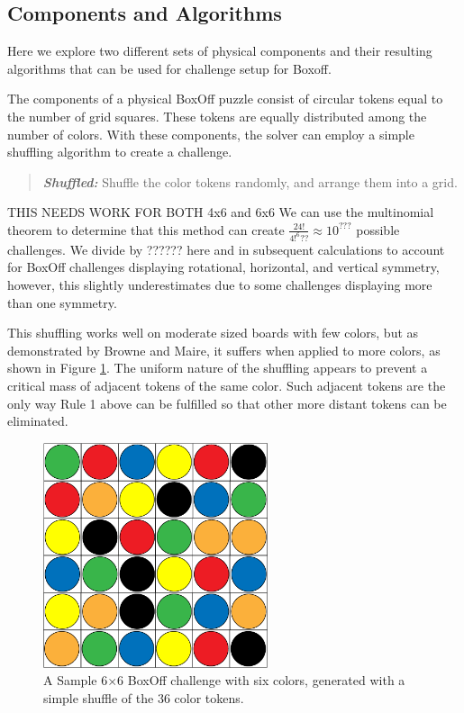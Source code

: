 \documentclass[journal]{IEEEtran}
\begin{document}

\subsection{Components and Algorithms}
Here we explore two different sets of physical components and their resulting algorithms that can be used for challenge setup for Boxoff. 

The components of a physical BoxOff puzzle consist of circular tokens equal to the number of grid squares. These tokens are equally distributed among the number of colors. 
With these components, the solver can employ a simple shuffling algorithm to create a challenge.
\begin{quote}
    {\it \bf Shuffled:} Shuffle the color tokens randomly, and arrange them into a grid.
\end{quote}

THIS NEEDS WORK FOR BOTH 4x6 and 6x6
We can use the multinomial theorem to determine that this method can create
$\frac{24!}{4!^{6}??} \approx 10^{???}$ possible challenges.  We divide by ?????? here and in subsequent calculations to account for BoxOff challenges displaying rotational, horizontal, and vertical symmetry, however, this slightly underestimates due to some challenges displaying more than one symmetry.

This shuffling works well on moderate sized boards with few colors, but as demonstrated by Browne and Maire, it suffers when applied to more colors, as shown in Figure \ref{fig:boxoff666}. The uniform nature of the shuffling appears to prevent a critical mass of adjacent tokens of the same color. Such adjacent tokens are the only way Rule 1 above can be fulfilled so that other more distant tokens can be eliminated.

\begin{figure}[t]
\centering
\includegraphics[width=6.6cm]{boxoff666basic.png}
\caption{A Sample 6$\times$6 BoxOff challenge with six colors, generated with a simple shuffle of the 36 color tokens. }
\label{fig:boxoff666}
\end{figure}
\end{document}
